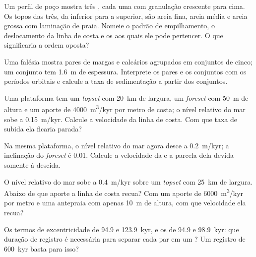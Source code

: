 \begin{exercise}[$\star$]\label{exo:b3:sequence-stratigraphy:3}
Um perfil de poço mostra três , cada uma com granulação crescente para cima. Os topos das
três, da inferior para a superior, são areia fina, areia média e areia grossa com
laminação de praia. Nomeie o padrão de empilhamento, o deslocamento da linha de costa e
os  aos quais ele pode pertencer. O que significaria a ordem oposta?
\end{exercise}

\begin{exercise}[$\star$]\label{exo:b3:sequence-stratigraphy:4}
Uma falésia mostra pares de margas e calcários agrupados em conjuntos de cinco; um
conjunto tem \qty{1.6}{m} de espessura. Interprete os pares e os conjuntos com os
períodos orbitais e calcule a taxa de sedimentação a partir dos conjuntos.
\end{exercise}

\begin{exercise}[$\star\star$]\label{exo:b3:sequence-stratigraphy:5}
Uma plataforma tem um \textit{topset} com \qty{20}{km} de largura, um \textit{foreset} com \qty{50}{m} de altura e um
aporte de \qty{4000}{m^3/kyr} por metro de costa; o nível relativo do mar sobe
a \qty{0.15}{m/kyr}. Calcule a velocidade da linha de costa. Com que taxa de
subida ela ficaria parada?
\end{exercise}

\begin{exercise}[$\star\star$]\label{exo:b3:sequence-stratigraphy:6}
Na mesma plataforma, o nível relativo do mar agora desce a \qty{0.2}{m/kyr}; a
inclinação do \textit{foreset} é 0.01. Calcule a velocidade da  e a
parcela dela devida somente à descida.
\end{exercise}

\begin{exercise}[$\star\star$]\label{exo:b3:sequence-stratigraphy:7}
O nível relativo do mar sobe a \qty{0.4}{m/kyr} sobre um \textit{topset} com \qty{25}{km} de largura.
Abaixo de que aporte a linha de costa recua? Com um aporte de
\qty{6000}{m^3/kyr} por metro e uma antepraia com apenas \qty{10}{m} de altura, com que
velocidade ela recua?
\end{exercise}

\begin{exercise}[$\star\star$]\label{exo:b3:sequence-stratigraphy:8}
Os termos de excentricidade de 94.9 e \qty{123.9}{kyr}, e os de 94.9 e
\qty{98.9}{kyr}: que duração de registro é necessária para separar cada par em um
? Um registro de \qty{600}{kyr} basta para isso?
\end{exercise}

